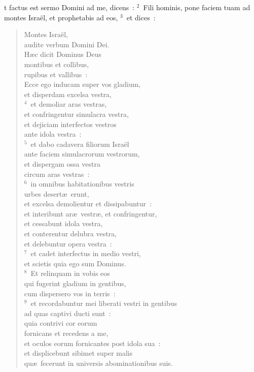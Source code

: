 \bchapter
{}t factus est sermo Domini ad me, dicens~:
${}^{2}$~Fili hominis, pone faciem tuam ad montes Isra\"el, et prophetabis ad eos,
${}^{3}$~et dices~: \begin{verse}Montes Isra\"el,\\ audite verbum Domini Dei.\\ H\ae c dicit Dominus Deus\\ montibus et collibus,\\ rupibus et vallibus~:\\ Ecce ego inducam super vos gladium,\\ et disperdam excelsa vestra,\\
${}^{4}$~et demoliar aras vestras,\\ et confringentur simulacra vestra,\\ et dejiciam interfectos vestros\\ ante idola vestra~:\\
${}^{5}$~et dabo cadavera filiorum Isra\"el\\ ante faciem simulacrorum vestrorum,\\ et dispergam ossa vestra\\ circum aras vestras~:\\
${}^{6}$~in omnibus habitationibus vestris\\ urbes desert\ae\ erunt,\\ et excelsa demolientur et dissipabuntur~:\\ et interibunt ar\ae\ vestr\ae , et confringentur,\\ et cessabunt idola vestra,\\ et conterentur delubra vestra,\\ et delebuntur opera vestra~:\\
${}^{7}$~et cadet interfectus in medio vestri,\\ et scietis quia ego sum Dominus.\\
${}^{8}$~Et relinquam in vobis eos\\ qui fugerint gladium in gentibus,\\ cum dispersero vos in terris~:\\
${}^{9}$~et recordabuntur mei liberati vestri in gentibus\\ ad quas captivi ducti sunt~:\\ quia contrivi cor eorum\\ fornicans et recedens a me,\\ et oculos eorum fornicantes post idola sua~:\\ et displicebunt sibimet super malis\\ qu\ae\ fecerunt in universis abominationibus suis.\\

\end{verse}
